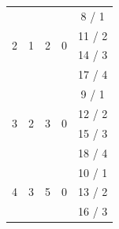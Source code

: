 \begin{table}[H]
\begin{tabular}{|c|c|c|c|c|}
		\multirow{4}{*}{2} & \multirow{4}{*}{1} & \multirow{4}{*}{2} & \multirow{4}{*}{0}                                                       & 8 / 1                                                                        \\ \cline{5-5} 
		&                    &                    &                                                                          & 11 / 2                                                                       \\ \cline{5-5} 
		&                    &                    &                                                                          & 14 / 3                                                                       \\ \cline{5-5} 
		&                    &                    &                                                                          & 17 / 4                                                                       \\ \hline
		\multirow{4}{*}{3} & \multirow{4}{*}{2} & \multirow{4}{*}{3} & \multirow{4}{*}{0}                                                       & 9 / 1                                                                        \\ \cline{5-5} 
		&                    &                    &                                                                          & 12 / 2                                                                       \\ \cline{5-5} 
		&                    &                    &                                                                          & 15 / 3                                                                       \\ \cline{5-5} 
		&                    &                    &                                                                          & 18 / 4                                                                       \\ \hline
		\multirow{4}{*}{4} & \multirow{4}{*}{3} & \multirow{4}{*}{5} & \multirow{4}{*}{0}                                                       & 10 / 1                                                                       \\ \cline{5-5} 
		&                    &                    &                                                                          & 13 / 2                                                                       \\ \cline{5-5} 
		&                    &                    &                                                                          & 16 / 3                                                                       \\ \cline{5-5} 

\end{tabular}
\end{table}
